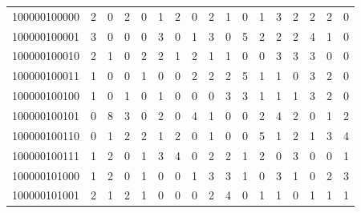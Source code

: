 \documentclass[10pt,a4paper]{article}
\begin{document}
\begin{longtable}{ |c|c|c|c|c|c|c|c|c|c|c|c|c|c|c|c|c| }
    100000100000              & 2                            & 0                                & 2                            & 0                              & 1   & 2   & 0   & 2   & 1   & 0   & 1   & 3   & 2   & 2   & 2   & 0   \\
    100000100001              & 3                            & 0                                & 0                            & 0                              & 3   & 0   & 1   & 3   & 0   & 5   & 2   & 2   & 2   & 4   & 1   & 0   \\
    100000100010              & 2                            & 1                                & 0                            & 2                              & 2   & 1   & 2   & 1   & 1   & 0   & 0   & 3   & 3   & 3   & 0   & 0   \\
    100000100011              & 1                            & 0                                & 0                            & 1                              & 0   & 0   & 2   & 2   & 2   & 5   & 1   & 1   & 0   & 3   & 2   & 0   \\
    100000100100              & 1                            & 0                                & 1                            & 0                              & 1   & 0   & 0   & 0   & 3   & 3   & 1   & 1   & 1   & 3   & 2   & 0   \\
    100000100101              & 0                            & 8                                & 3                            & 0                              & 2   & 0   & 4   & 1   & 0   & 0   & 2   & 4   & 2   & 0   & 1   & 2   \\
    100000100110              & 0                            & 1                                & 2                            & 2                              & 1   & 2   & 0   & 1   & 0   & 0   & 5   & 1   & 2   & 1   & 3   & 4   \\
    100000100111              & 1                            & 2                                & 0                            & 1                              & 3   & 4   & 0   & 2   & 2   & 1   & 2   & 0   & 3   & 0   & 0   & 1   \\
    100000101000              & 1                            & 2                                & 0                            & 1                              & 0   & 0   & 1   & 3   & 3   & 1   & 0   & 3   & 1   & 0   & 2   & 3   \\
    100000101001              & 2                            & 1                                & 2                            & 1                              & 0   & 0   & 0   & 2   & 4   & 0   & 1   & 1   & 0   & 1   & 1   & 1   \\

\end{longtable}
\end{document}
